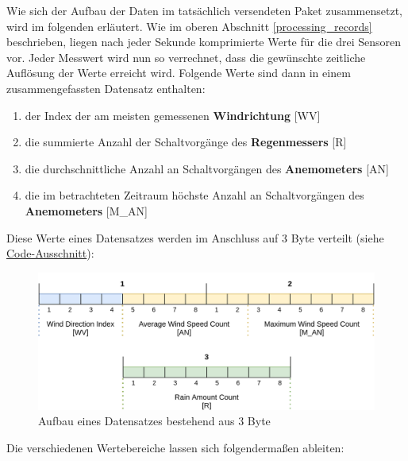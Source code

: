\documentclass[12pt]{article}
\begin{document}
      Wie sich der Aufbau der Daten im tatsächlich versendeten Paket zusammensetzt, wird im folgenden erläutert.
      Wie im oberen Abschnitt \underline{\ref{processing_records}} beschrieben, liegen nach jeder Sekunde komprimierte Werte für die drei Sensoren vor.
      Jeder Messwert wird nun so verrechnet, dass die gewünschte zeitliche Auflösung der Werte erreicht wird.
      Folgende Werte sind dann in einem zusammengefassten Datensatz enthalten:

      \begin{enumerate}
        \item der Index der am meisten gemessenen \textbf{Windrichtung} [WV]
        \item die summierte Anzahl der Schaltvorgänge des \textbf{Regenmessers} [R]
        \item die durchschnittliche Anzahl an Schaltvorgängen des \textbf{Anemometers} [AN]
        \item die im betrachteten Zeitraum höchste Anzahl an Schaltvorgängen des \textbf{Anemometers} [M\_AN]
      \end{enumerate}

      Diese Werte eines Datensatzes werden im Anschluss auf 3 Byte verteilt (siehe \href{https://github.com/HTWDD-RN/ps21-LoRa/blob/9c012bc1d41e960b6edf9e756e8948e387f28c83/src/lora_weather_station/lora_weather_station.ino#L120}{Code-Ausschnitt}):

      \begin{figure}[H]
        \centering
        \includegraphics[scale=0.2]{Record_Byte_Representation.png}
        \caption{Aufbau eines Datensatzes bestehend aus 3 Byte}
      \end{figure}

      Die verschiedenen Wertebereiche lassen sich folgendermaßen ableiten:
\end{document}

